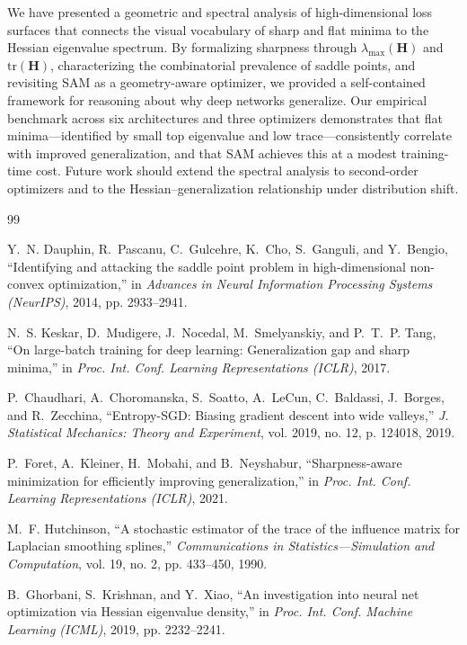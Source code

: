 \documentclass[twocolumn,10pt]{article}
\newcommand{\Hmat}{\mathbf{H}}
\begin{document}
We have presented a geometric and spectral analysis of high-dimensional loss surfaces that connects the visual vocabulary of sharp and flat minima to the Hessian eigenvalue spectrum. By formalizing sharpness through $\lambda_{\max}(\Hmat)$ and $\mathrm{tr}(\Hmat)$, characterizing the combinatorial prevalence of saddle points, and revisiting SAM as a geometry-aware optimizer, we provided a self-contained framework for reasoning about why deep networks generalize. Our empirical benchmark across six architectures and three optimizers demonstrates that flat minima---identified by small top eigenvalue and low trace---consistently correlate with improved generalization, and that SAM achieves this at a modest training-time cost. Future work should extend the spectral analysis to second-order optimizers and to the Hessian--generalization relationship under distribution shift.

\begin{thebibliography}{99}

Y.~N. Dauphin, R.~Pascanu, C.~Gulcehre, K.~Cho, S.~Ganguli, and Y.~Bengio,
``Identifying and attacking the saddle point problem in high-dimensional non-convex optimization,''
in \emph{Advances in Neural Information Processing Systems (NeurIPS)}, 2014, pp. 2933--2941.

N.~S. Keskar, D.~Mudigere, J.~Nocedal, M.~Smelyanskiy, and P.~T.~P. Tang,
``On large-batch training for deep learning: Generalization gap and sharp minima,''
in \emph{Proc. Int. Conf. Learning Representations (ICLR)}, 2017.

P.~Chaudhari, A.~Choromanska, S.~Soatto, A.~LeCun, C.~Baldassi, J.~Borges, and R.~Zecchina,
``Entropy-SGD: Biasing gradient descent into wide valleys,''
\emph{J. Statistical Mechanics: Theory and Experiment}, vol. 2019, no. 12, p. 124018, 2019.

P.~Foret, A.~Kleiner, H.~Mobahi, and B.~Neyshabur,
``Sharpness-aware minimization for efficiently improving generalization,''
in \emph{Proc. Int. Conf. Learning Representations (ICLR)}, 2021.

M.~F. Hutchinson,
``A stochastic estimator of the trace of the influence matrix for Laplacian smoothing splines,''
\emph{Communications in Statistics---Simulation and Computation}, vol. 19, no. 2, pp. 433--450, 1990.

B.~Ghorbani, S.~Krishnan, and Y.~Xiao,
``An investigation into neural net optimization via Hessian eigenvalue density,''
in \emph{Proc. Int. Conf. Machine Learning (ICML)}, 2019, pp. 2232--2241.

\end{thebibliography}
\end{document}
